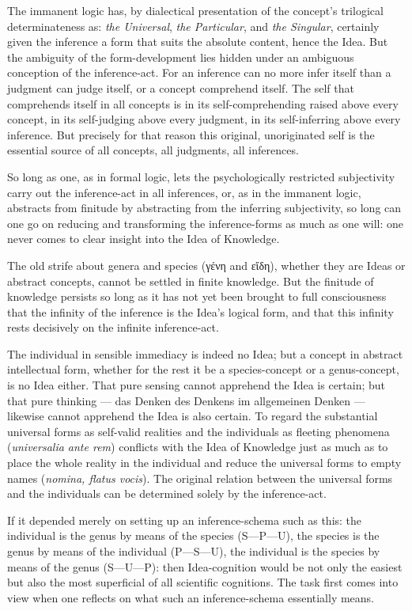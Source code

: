 \documentclass[12pt]{book}
\begin{document}
The immanent logic has, by dialectical presentation of the concept's
trilogical determinateness as: \emph{the Universal}, \emph{the
Particular}, and \emph{the Singular}, certainly given the inference
a form that suits the absolute content, hence the Idea. But the
ambiguity of the form-development lies hidden under an ambiguous
conception of the inference-act. For an inference can no more infer
itself than a judgment can judge itself, or a concept comprehend
itself. The self that comprehends itself in all concepts is in its
self-comprehending raised above every concept, in its self-judging
above every judgment, in its self-inferring above every inference.
But precisely for that reason this original, unoriginated self is
the essential source of all concepts, all judgments, all inferences.

So long as one, as in formal logic, lets the psychologically
restricted subjectivity carry out the inference-act in all
inferences, or, as in the immanent logic, abstracts from finitude by
abstracting from the inferring subjectivity, so long can one go on
reducing and transforming the inference-forms as much as one will:
one never comes to clear insight into the Idea of Knowledge.

The old strife about genera and species (γένη and εἴδη), whether
they are Ideas or abstract concepts, cannot be settled in finite
knowledge. But the finitude of knowledge persists so long as it has
not yet been brought to full consciousness that the infinity of the
inference is the Idea's logical form, and that this infinity rests
decisively on the infinite inference-act.

The individual in sensible immediacy is indeed no Idea; but a
concept in abstract intellectual form, whether for the rest it be a
species-concept or a genus-concept, is no Idea either. That pure
sensing cannot apprehend the Idea is certain; but that pure thinking
--- das Denken
des Denkens im allgemeinen Denken --- likewise cannot apprehend the
Idea is also certain. To regard the substantial universal forms as
self-valid realities and the individuals as fleeting phenomena
(\textit{universalia ante rem}) conflicts with the Idea of Knowledge
just as much as to place the whole reality in the individual and
reduce the universal forms to empty names (\textit{nomina, flatus
vocis}). The original relation between the universal forms and the
individuals can be determined solely by the inference-act.

If it depended merely on setting up an inference-schema such as
this: the individual is the genus by means of the species
(S---P---U), the species is the genus by means of the individual
(P---S---U), the individual is the species by means of the genus
(S---U---P): then Idea-cognition would be not only the easiest but
also the most superficial of all scientific cognitions.
The task first comes into view when one reflects on what such an
inference-schema essentially means.
\end{document}
